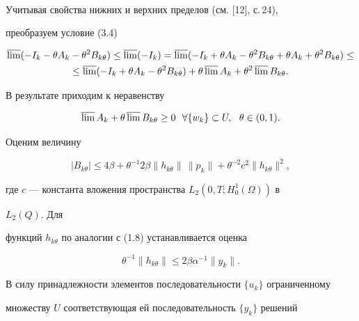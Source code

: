 \begin{pf}
\begin{gather*}
\end{gather*} 


Учитывая свойства нижних и верхних пределов (см. [12], с.\,24), 


преобразуем условие (3.4)


\begin{multline*} 


\varlimsup(-I_k-\theta A_k-\theta^2B_{k\theta})\le 


\varlimsup(-I_k)=\varlimsup(-I_k+\theta A_k- 


\theta^2B_{k\theta}+\theta A_k+\theta^2B_{k\theta})\le \\ 


% 


\le\varlimsup(-I_k+\theta A_k-\theta^2B_{k\theta})+ 


\theta\varlimsup A_k+\theta^2\varlimsup B_{k\theta}. 


\end{multline*} 


В результате приходим к неравенству 


\begin{equation} 


\varlimsup A_k+\theta\varlimsup B_{k\theta}\ge0 


\ \ \forall\{w_k\}\subset U,\ \ \theta\in(0,1). 


\end{equation} 


Оценим величину 


\begin{equation} 


|B_{k\theta}|\le4\beta+\theta^{-1}2\beta\|h_{k\theta}\|\, 


\|p_k\|+\theta^{-2}c^2\|h_{k\theta}\|^2, 


\end{equation} 


где $c$ --- константа вложения пространства $L_2(0,T;H^1_0(\Omega))$ в 


$L_2(Q)$. Для 


функций $h_{k\theta}$ по аналогии с (1.8) устанавливается оценка 


$$ 


\theta^{-1}\|h_{k\theta}\|\le2\beta\alpha^{-1}\|y_k\|. 


$$ 


В силу принадлежности элементов последовательности $\{u_k\}$ ограниченному 


множеству $U$ соответствующая ей последовательность $\{y_k\}$ решений 



\end{pf}
